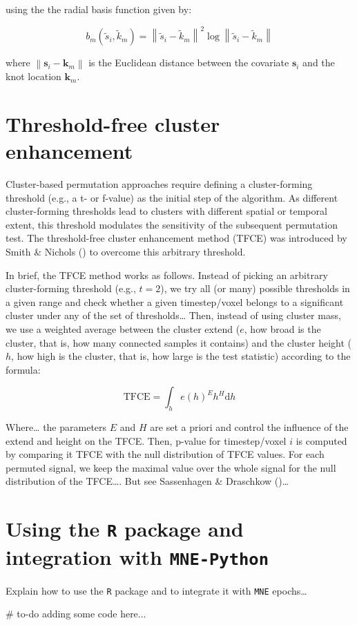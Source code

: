 \documentclass[
  doc,
  floatsintext,
  longtable,
  a4paper,
  nolmodern,
  notxfonts,
  notimes,
  colorlinks=true,linkcolor=blue,citecolor=blue,urlcolor=blue]{apa7}
\newenvironment{Shaded}{\begin{snugshade}}{\end{snugshade}}
\newcommand{\CommentTok}[1]{\textcolor[rgb]{0.37,0.37,0.37}{#1}}
\begin{document}
using the the radial basis function given by:

\[
b_m\left(\tilde{s}_i, \tilde{k}_m\right)=\left\|\tilde{s}_i-\tilde{k}_m\right\|^2 \log \left\|\tilde{s}_i-\tilde{k}_m\right\|
\]

where \(\left\|\mathbf{s}_i-\mathbf{k}_{m}\right\|\) is the Euclidean
distance between the covariate \(\mathbf{s}_{i}\) and the knot location
\(\mathbf{k}_{m}\).

\newpage

\section{Threshold-free cluster
enhancement}\label{threshold-free-cluster-enhancement}

Cluster-based permutation approaches require defining a cluster-forming
threshold (e.g., a t- or f-value) as the initial step of the algorithm.
As different cluster-forming thresholds lead to clusters with different
spatial or temporal extent, this threshold modulates the sensitivity of
the subsequent permutation test. The threshold-free cluster enhancement
method (TFCE) was introduced by Smith \& Nichols
() to overcome this arbitrary threshold.

In brief, the TFCE method works as follows. Instead of picking an
arbitrary cluster-forming threshold (e.g., \(t=2\)), we try all (or
many) possible thresholds in a given range and check whether a given
timestep/voxel belongs to a significant cluster under any of the set of
thresholds\ldots{} Then, instead of using cluster mass, we use a
weighted average between the cluster extend (\(e\), how broad is the
cluster, that is, how many connected samples it contains) and the
cluster height (\(h\), how high is the cluster, that is, how large is
the test statistic) according to the formula:

\[
\text{TFCE} = \int_{h} e(h)^{E} h^{H} \mathrm{d}h
\]

Where\ldots{} the parameters \(E\) and \(H\) are set a priori and
control the influence of the extend and height on the TFCE. Then,
p-value for timestep/voxel \(i\) is computed by comparing it TFCE with
the null distribution of TFCE values. For each permuted signal, we keep
the maximal value over the whole signal for the null distribution of the
TFCE\ldots. But see Sassenhagen \& Draschkow
()\ldots{}

\newpage

\section{\texorpdfstring{Using the \texttt{R} package and integration
with
\texttt{MNE-Python}}{Using the R package and integration with MNE-Python}}\label{using-the-r-package-and-integration-with-mne-python}

Explain how to use the \texttt{R} package and to integrate it with
\texttt{MNE} epochs\ldots{}

\begin{Shaded}
\begin{Highlighting}[]
\CommentTok{\# to{-}do adding some code here...}
\end{Highlighting}
\end{Shaded}
\end{document}
